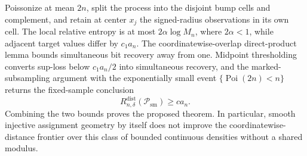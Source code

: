 Poissonize at mean \(2n\), split the process into the disjoint bump cells and complement, and retain at center \(x_j\) the signed-radius observations in its own cell.  The local relative entropy is at most \(2\alpha\log M_n\), where \(2\alpha<1\), while adjacent target values differ by \(c_1a_n\).  The coordinatewise-overlap direct-product lemma bounds simultaneous bit recovery away from one.  Midpoint thresholding converts sup-loss below \(c_1a_n/2\) into simultaneous recovery, and the marked-subsampling argument with the exponentially small event \(\{\operatorname{Poi}(2n)<n\}\) returns the fixed-sample conclusion
\[
R_{n,\delta}^{\mathrm{dist}}(\mathcal P_{\mathrm{sm}})\geq ca_n.
\]
Combining the two bounds proves the proposed theorem.  In particular, smooth injective assignment geometry by itself does not improve the coordinatewise-distance frontier over this class of bounded continuous densities without a shared modulus.